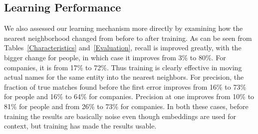 \subsection{Learning Performance}

 We also assessed our learning mechanism more directly by examining how the nearest neighborhood changed from before to after training.  As can be seen from Tables~\ref{Characteristics} and~\ref{Evaluation}, recall is improved greatly, with the bigger change for people, in which case it improves from 3\% to 80\%.  For companies, it is from 17\% to 72\%.  Thus training is clearly effective in moving actual names for the same entity into the nearest neighbors.  For precision, the fraction of true matches found before the first error improves from 16\% to 73\% for people and 16\% to 64\% for companies.  Precision at one improves from 10\% to 81\% for people and from 26\% to 73\% for companies.  In both these cases, before training the results are basically noise even though embeddings are used for context, but training has made the results usable.

